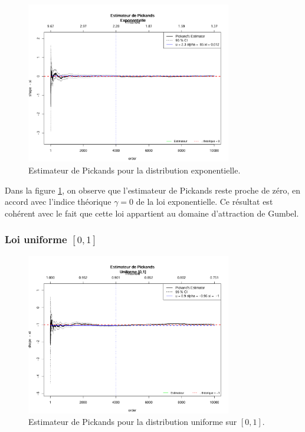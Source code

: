 \documentclass{article}
\begin{document}
\begin{figure}[H]
    \centering
    \includegraphics[width=0.8\textwidth]{./images/exponentielle.png}
    \caption{Estimateur de Pickands pour la distribution exponentielle.}
    \label{fig:pickands_exponentielle}
\end{figure}

Dans la figure \ref{fig:pickands_exponentielle}, on observe que l’estimateur de Pickands reste proche de zéro, en accord avec l’indice théorique \(\gamma = 0\) de la loi exponentielle. Ce résultat est cohérent avec le fait que cette loi appartient au domaine d’attraction de Gumbel.
\subsubsection{Loi uniforme \([0,1]\)}

\begin{figure}[H]
    \centering
    \includegraphics[width=0.8\textwidth]{./images/uniforme.png}
    \caption{Estimateur de Pickands pour la distribution uniforme sur \([0,1]\).}
    \label{fig:pickands_uniforme}
\end{figure}
\end{document}
